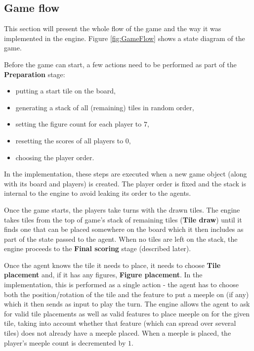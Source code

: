 \subsection{Game flow}

This section will present the whole flow of the game and the way it was implemented in the engine.
Figure \ref{fig:GameFlow} shows a state diagram of the game.

\begin{figure*}
	\centering
	\scalebox{.42}{}
	\caption{Carcassonne's state diagram}
	\label{fig:GameFlow}
\end{figure*}

Before the game can start, a few actions need to be performed as part of the \textbf{Preparation} stage:
\begin{itemize}
	\item putting a start tile on the board,
	\item generating a stack of all (remaining) tiles in random order,
	\item setting the figure count for each player to $7$,
	\item resetting the scores of all players to $0$,
	\item choosing the player order.
\end{itemize}
In the implementation, these steps are executed when a new game object (along with its board
and players) is created. The player order is fixed and the stack is internal to the engine
to avoid leaking its order to the agents.

Once the game starts, the players take turns with the drawn tiles. The engine takes tiles from
the top of game's stack of remaining tiles (\textbf{Tile draw}) until it finds one that can be
placed somewhere on the board which it then includes as part of the state passed to the agent.
When no tiles are left on the stack, the engine proceeds to the \textbf{Final scoring} stage
(described later).

Once the agent knows the tile it needs to place, it needs to choose \textbf{Tile placement} and,
if it has any figures, \textbf{Figure placement}. In the implementation, this is performed
as a single action - the agent has to choose both the position/rotation of the tile and the feature
to put a meeple on (if any) which it then sends as input to play the turn.
The engine allows the agent to ask for valid tile placements as well as valid features to
place meeple on for the given tile, taking into account whether that feature (which can spread
over several tiles) does not already have a meeple placed. When a meeple is placed,
the player's meeple count is decremented by $1$.

